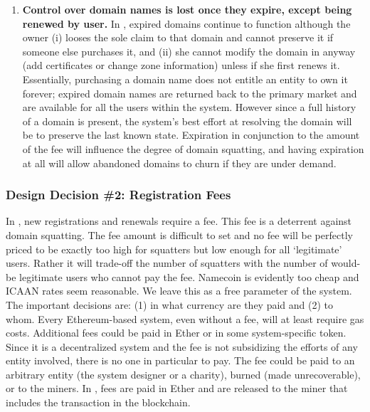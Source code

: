 \begin{enumerate}
\item \textbf{Control over domain names is lost once they expire, except being renewed by user.} In \Ghazal, expired domains continue to function although the owner (i) looses the sole claim to that domain and cannot preserve it if someone else purchases it, and (ii) she cannot modify the domain in anyway (\eg add certificates or change zone information) unless if she first renews it. Essentially, purchasing a domain name does not entitle an entity to own it forever; expired domain names are returned back to the primary market and are available for all the users within the system. However since a full history of a domain is present, the system's best effort at resolving the domain will be to preserve the last known state. Expiration in conjunction to the amount of the fee will influence the degree of domain squatting, and having expiration at all will allow abandoned domains to churn if they are under demand. 

\end {enumerate}


\subsubsection{Design Decision \#2: Registration Fees\newline} 

In \Ghazal, new registrations and renewals require a fee. This fee is a deterrent against domain squatting. The fee amount is difficult to set and no fee will be perfectly priced to be exactly too high for squatters but low enough for all `legitimate' users. Rather it will trade-off the number of squatters with the number of would-be legitimate users who cannot pay the fee. Namecoin is evidently too cheap and ICAAN rates seem reasonable. We leave this as a free parameter of the system. The important decisions are: (1) in what currency are they paid and (2) to whom. Every Ethereum-based system, even without a fee, will at least require gas costs. Additional fees could be paid in Ether or in some system-specific token. Since it is a decentralized system and the fee is not subsidizing the efforts of any entity involved, there is no one in particular to pay. The fee could be paid to an arbitrary entity (the system designer or a charity), burned (made unrecoverable), or to the miners. In \Ghazal, fees are paid in Ether and are released to the miner that includes the transaction in the blockchain. 

